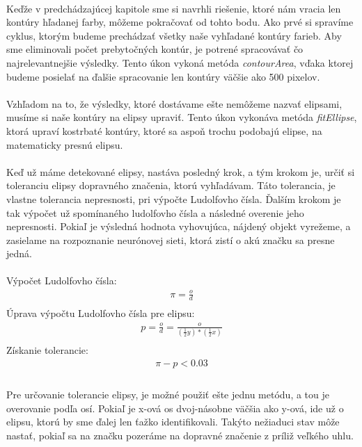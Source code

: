 \documentclass[12pt]{article}
\begin{document}
\paragraph{}
Keďže v predchádzajúcej kapitole sme si navrhli riešenie, ktoré nám vracia len kontúry hľadanej farby, môžeme pokračovať od tohto bodu.
Ako prvé si spravíme cyklus, ktorým budeme prechádzať všetky naše vyhľadané kontúry farieb. Aby sme eliminovali počet prebytočných kontúr, 
je potrené spracovávať čo najrelevantnejšie výsledky. Tento úkon vykoná metóda \emph{contourArea}, vďaka ktorej budeme posielať na ďalšie spracovanie len kontúry väčšie ako 500 pixelov.
\paragraph{}
Vzhľadom na to, že výsledky, ktoré dostávame ešte nemôžeme nazvať elipsami, musíme si naše kontúry na elipsy upraviť.
Tento úkon vykonáva metóda \emph{fitEllipse}, ktorá upraví kostrbaté kontúry, ktoré sa aspoň trochu podobajú elipse, na matematicky presnú elipsu.
\paragraph{}
Keď už máme detekované elipsy, nastáva posledný krok, a tým krokom je, určiť si toleranciu elipsy dopravného značenia, ktorú vyhľadávam.
Táto tolerancia, je vlastne tolerancia nepresnosti, pri výpočte Ludolfovho čísla. 
Ďalším krokom je tak výpočet už spomínaného ludolfovho čísla a následné overenie jeho nepresnosti. 
Pokiaľ je výsledná hodnota vyhovujúca, nájdený objekt vyrežeme, a zasielame na rozpoznanie neurónovej sieti, ktorá zistí o akú značku sa presne jedná.
\paragraph{}
Výpočet Ludolfovho čísla:
\begin{align*}
          \pi = \frac{o}{d} \\
\end{align*}
Úprava výpočtu Ludolfovho čísla pre elipsu:
\begin{align*}
          p = \frac{o}{d} = \frac{o}{(\frac{1}{2} y) * ( \frac{1}{2} x)} \\
\end{align*}
Získanie tolerancie:
\begin{align*}
          \pi - p < 0.03 \\
\end{align*}
\paragraph{}
Pre určovanie tolerancie elipsy, je možné použiť ešte jednu metódu, a tou je overovanie podľa osí. 
Pokiaľ je x-ová os dvoj-násobne väčšia ako y-ová, ide už o elipsu, ktorú by sme ďalej len ťažko identifikovali. 
Takýto nežiaduci stav môže nastať, pokiaľ sa na značku pozeráme na dopravné značenie z príliž veľkého uhlu.
\end{document}

